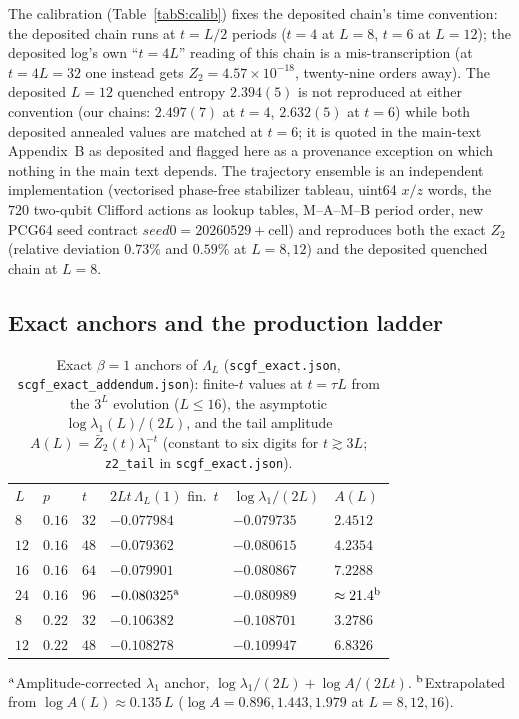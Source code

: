 \documentclass[aps,prx,reprint,superscriptaddress,nobibnotes,longbibliography]{revtex4-2}
\begin{document}
The calibration (Table~\ref{tabS:calib}) fixes the deposited chain's
time convention: the deposited chain runs at $t=L/2$ periods ($t=4$ at
$L=8$, $t=6$ at $L=12$); the deposited log's own ``$t=4L$'' reading of
this chain is a mis-transcription (at $t=4L=32$ one instead gets
$Z_2=4.57\times10^{-18}$, twenty-nine orders away).  The deposited
$L=12$ quenched entropy $2.394(5)$ is not reproduced at either
convention (our chains: $2.497(7)$ at $t=4$, $2.632(5)$ at $t=6$) while
both deposited annealed values are matched at $t=6$; it is quoted in the
main-text Appendix~B as deposited and flagged here as a provenance
exception on which nothing in the main text depends.  The trajectory
ensemble is an independent implementation (vectorised phase-free
stabilizer tableau, uint64 $x/z$ words, the $720$ two-qubit Clifford
actions as lookup tables, M--A--M--B period order, new PCG64 seed
contract $\mathit{seed0}=20260529+\text{cell}$) and reproduces both the
exact $Z_2$ (relative deviation $0.73\%$ and $0.59\%$ at $L=8,12$) and
the deposited quenched chain at $L=8$.

\subsection{Exact anchors and the production ladder}

\begin{table}[t]
\caption{Exact $\beta=1$ anchors of $\Lambda_L$
(\texttt{scgf\_exact.json}, \texttt{scgf\_exact\_addendum.json}):
finite-$t$ values at $t=\tau L$ from the $3^L$ evolution ($L\le16$), the
asymptotic $\log\lambda_1(L)/(2L)$, and the tail amplitude
$A(L)=\bar Z_2(t)\lambda_1^{-t}$ (constant to six digits for
$t\gtrsim3L$; \texttt{z2\_tail} in \texttt{scgf\_exact.json}).}
\label{tabS:anchors}
\begin{ruledtabular}
\begin{tabular}{llllll}
$L$ & $p$ & $t$ & $2Lt\,\Lambda_L(1)$ fin.\ $t$ & $\log\lambda_1/(2L)$ &
$A(L)$\\
\colrule
$8$ & $0.16$ & $32$ & $-0.077984$ & $-0.079735$ & $2.4512$\\
$12$ & $0.16$ & $48$ & $-0.079362$ & $-0.080615$ & $4.2354$\\
$16$ & $0.16$ & $64$ & $-0.079901$ & $-0.080867$ & $7.2288$\\
$24$ & $0.16$ & $96$ & $-0.080325^{\rm a}$ & $-0.080989$ &
$\approx21.4^{\rm b}$\\
$8$ & $0.22$ & $32$ & $-0.106382$ & $-0.108701$ & $3.2786$\\
$12$ & $0.22$ & $48$ & $-0.108278$ & $-0.109947$ & $6.8326$\\
\end{tabular}
\end{ruledtabular}
$^{\rm a}$Amplitude-corrected $\lambda_1$ anchor,
$\log\lambda_1/(2L)+\log A/(2Lt)$.  $^{\rm b}$Extrapolated from
$\log A(L)\approx0.135\,L$ ($\log A=0.896,1.443,1.979$ at $L=8,12,16$).
\end{table}
\end{document}
